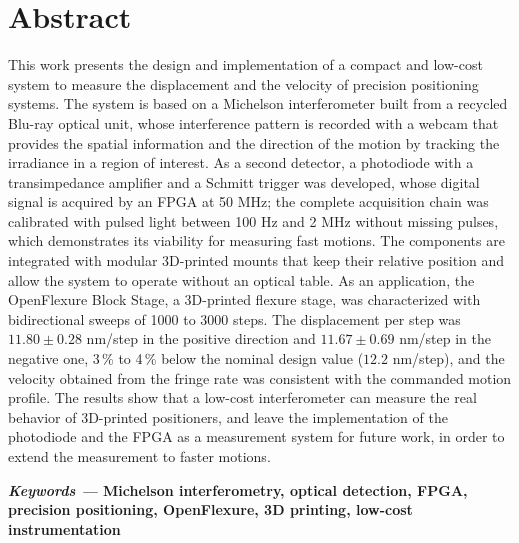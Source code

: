 
\newpage

\section*{Abstract}

This work presents the design and implementation of a compact and low-cost system to measure the displacement and the velocity of precision positioning systems. The system is based on a Michelson interferometer built from a recycled Blu-ray optical unit, whose interference pattern is recorded with a webcam that provides the spatial information and the direction of the motion by tracking the irradiance in a region of interest. As a second detector, a photodiode with a transimpedance amplifier and a Schmitt trigger was developed, whose digital signal is acquired by an FPGA at 50 MHz; the complete acquisition chain was calibrated with pulsed light between 100 Hz and 2 MHz without missing pulses, which demonstrates its viability for measuring fast motions. The components are integrated with modular 3D-printed mounts that keep their relative position and allow the system to operate without an optical table. As an application, the OpenFlexure Block Stage, a 3D-printed flexure stage, was characterized with bidirectional sweeps of 1000 to 3000 steps. The displacement per step was $11.80 \pm 0.28$ nm/step in the positive direction and $11.67 \pm 0.69$ nm/step in the negative one, 3\,\% to 4\,\% below the nominal design value ($12.2$ nm/step), and the velocity obtained from the fringe rate was consistent with the commanded motion profile. The results show that a low-cost interferometer can measure the real behavior of 3D-printed positioners, and leave the implementation of the photodiode and the FPGA as a measurement system for future work, in order to extend the measurement to faster motions.



\vspace{1cm}\textbf{\textit{Keywords ---} Michelson interferometry, optical detection, FPGA, precision positioning, OpenFlexure, 3D printing, low-cost instrumentation}


\newpage
